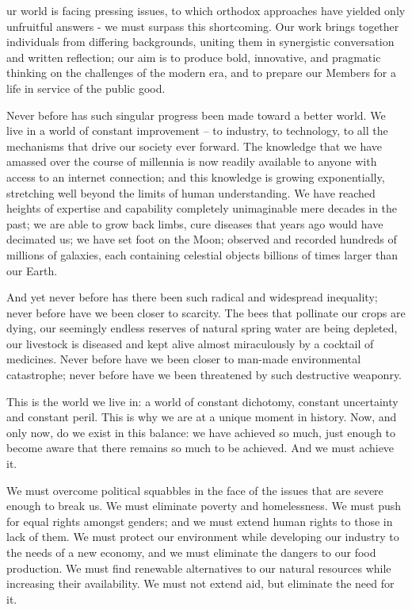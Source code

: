 
   ur world is facing pressing issues, to which orthodox approaches have
   yielded only unfruitful answers - we must surpass this shortcoming. Our
   work brings together individuals from differing backgrounds, uniting
   them in synergistic conversation and written reflection; our aim is to
   produce bold, innovative, and pragmatic thinking on the challenges of
   the modern era, and to prepare our Members for a life in service of the
   public good.

   Never before has such singular progress been made toward a better
   world. We live in a world of constant improvement -- to industry, to
   technology, to all the mechanisms that drive our society ever forward.
   The knowledge that we have amassed over the course of millennia is now
   readily available to anyone with access to an internet connection; and
   this knowledge is growing exponentially, stretching well beyond the
   limits of human understanding. We have reached heights of expertise and
   capability completely unimaginable mere decades in the past; we are
   able to grow back limbs, cure diseases that years ago would have
   decimated us; we have set foot on the Moon; observed and recorded
   hundreds of millions of galaxies, each containing celestial objects
   billions of times larger than our Earth.

   And yet never before has there been such radical and widespread
   inequality; never before have we been closer to scarcity. The bees that
   pollinate our crops are dying, our seemingly endless reserves of
   natural spring water are being depleted, our livestock is diseased and
   kept alive almost miraculously by a cocktail of medicines. Never before
   have we been closer to man-made environmental catastrophe; never before
   have we been threatened by such destructive weaponry.

   This is the world we live in: a world of constant dichotomy, constant
   uncertainty and constant peril. This is why we are at a unique moment
   in history. Now, and only now, do we exist in this balance: we have
   achieved so much, just enough to become aware that there remains so
   much to be achieved. And we must achieve it.

   We must overcome political squabbles in the face of the issues that are
   severe enough to break us. We must eliminate poverty and homelessness.
   We must push for equal rights amongst genders; and we must extend human
   rights to those in lack of them. We must protect our environment while
   developing our industry to the needs of a new economy, and we must
   eliminate the dangers to our food production. We must find renewable
   alternatives to our natural resources while increasing their
   availability. We must not extend aid, but eliminate the need for it.

